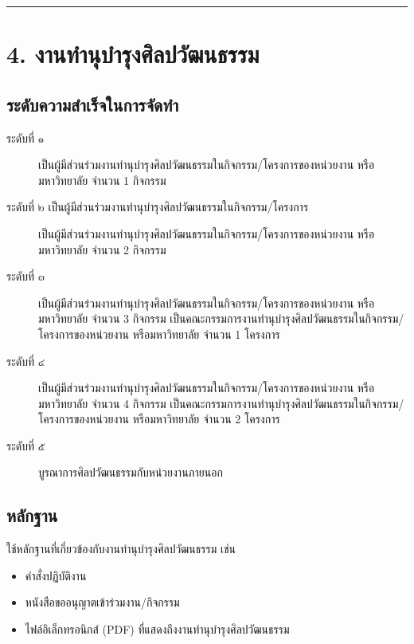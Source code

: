 \documentclass[a4paper,12pt,english]{sphinxmanual}
\begin{document}
\bigskip\hrule\bigskip



\section{4. งานทำนุบำรุงศิลปวัฒนธรรม}
\label{\detokenize{submission_part1:id14}}

\subsection{ระดับความสำเร็จในการจัดทำ}
\label{\detokenize{submission_part1:id15}}\begin{description}
\item[{ระดับที่ ๑}] \leavevmode
เป็นผู้มีส่วนร่วมงานทำนุบำรุงศิลปวัฒนธรรมในกิจกรรม/โครงการของหน่วยงาน หรือมหาวิทยาลัย จำนวน 1 กิจกรรม

\item[{ระดับที่ ๒  เป็นผู้มีส่วนร่วมงานทำนุบำรุงศิลปวัฒนธรรมในกิจกรรม/โครงการ}] \leavevmode
เป็นผู้มีส่วนร่วมงานทำนุบำรุงศิลปวัฒนธรรมในกิจกรรม/โครงการของหน่วยงาน หรือมหาวิทยาลัย จำนวน 2 กิจกรรม

\item[{ระดับที่ ๓}] \leavevmode
เป็นผู้มีส่วนร่วมงานทำนุบำรุงศิลปวัฒนธรรมในกิจกรรม/โครงการของหน่วยงาน หรือมหาวิทยาลัย จำนวน 3 กิจกรรม
 เป็นคณะกรรมการงานทำนุบำรุงศิลปวัฒนธรรมในกิจกรรม/โครงการของหน่วยงาน หรือมหาวิทยาลัย จำนวน 1 โครงการ

\item[{ระดับที่ ๔}] \leavevmode
เป็นผู้มีส่วนร่วมงานทำนุบำรุงศิลปวัฒนธรรมในกิจกรรม/โครงการของหน่วยงาน หรือมหาวิทยาลัย จำนวน 4 กิจกรรม
 เป็นคณะกรรมการงานทำนุบำรุงศิลปวัฒนธรรมในกิจกรรม/โครงการของหน่วยงาน หรือมหาวิทยาลัย จำนวน 2 โครงการ

\item[{ระดับที่ ๕}] \leavevmode
บูรณาการศิลปวัฒนธรรมกับหน่วยงานภายนอก

\end{description}


\subsection{หลักฐาน}
\label{\detokenize{submission_part1:id16}}
ใช้หลักฐานที่เกี่ยวข้องกับงานทำนุบำรุงศิลปวัฒนธรรม เช่น
\begin{itemize}
\item {} 
คำสั่งปฏิบัติงาน

\item {} 
หนังสือขออนุญาตเข้าร่วมงาน/กิจกรรม

\item {} 
ไฟล์อิเล็กทรอนิกส์ (PDF) ที่แสดงถึงงานทำนุบำรุงศิลปวัฒนธรรม

\end{itemize}
\end{document}
